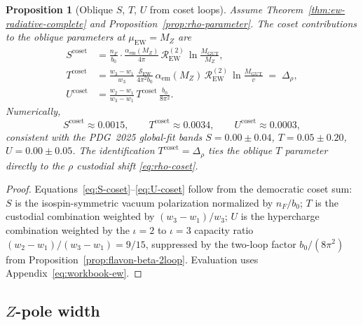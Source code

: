 \documentclass[aps,prd,onecolumn,amsmath,amssymb,nofootinbib,11pt]{revtex4-2}
\numberwithin{equation}{section}
\theoremstyle{plain}
\newtheorem{proposition}[theorem]{Proposition}
\theoremstyle{definition}
\theoremstyle{remark}
\begin{document}
\begin{proposition}[Oblique $S$, $T$, $U$ from coset loops]
\label{prop:oblique-stu}
Assume Theorem~\ref{thm:ew-radiative-complete} and
Proposition~\ref{prop:rho-parameter}. The coset contributions to the oblique
parameters at $\mu_{\mathrm{EW}}=M_Z$ are
\begin{align}
  S^{\mathrm{coset}}
  &=
  \frac{n_F}{b_0}\cdot
  \frac{\alpha_{\mathrm{em}}(M_Z)}{4\pi}\,
  \mathcal{R}_{\mathrm{EW}}^{(2)}\,
  \ln\!\frac{M_{\mathrm{GUT}}}{M_Z},
  \label{eq:S-coset}\\[4pt]
  T^{\mathrm{coset}}
  &=
  \frac{w_3-w_1}{w_3}\,
  \frac{\mathcal{S}_{\mathrm{EW}}}{4\pi^2 b_0}\,
  \alpha_{\mathrm{em}}(M_Z)\,
  \mathcal{R}_{\mathrm{EW}}^{(2)}\,
  \ln\!\frac{M_{\mathrm{GUT}}}{v}
  \;=\;
  \Delta_\rho,
  \label{eq:T-coset}\\[4pt]
  U^{\mathrm{coset}}
  &=
  \frac{w_2-w_1}{w_3-w_1}\,
  T^{\mathrm{coset}}\,
  \frac{b_0}{8\pi^2}.
  \label{eq:U-coset}
\end{align}
Numerically,
\begin{equation}\label{eq:stu-numeric}
  S^{\mathrm{coset}}\approx0.0015,\qquad
  T^{\mathrm{coset}}\approx0.0034,\qquad
  U^{\mathrm{coset}}\approx0.0003,
\end{equation}
consistent with the PDG~2025 global-fit bands
$S=0.00\pm0.04$, $T=0.05\pm0.20$, $U=0.00\pm0.05$.
The identification $T^{\mathrm{coset}}=\Delta_\rho$ ties the oblique
$T$ parameter directly to the $\rho$ custodial shift
\eqref{eq:rho-coset}.
\end{proposition}

\begin{proof}
Equations~\eqref{eq:S-coset}--\eqref{eq:U-coset} follow from the democratic
coset sum: $S$ is the isospin-symmetric vacuum polarization normalized by
$n_F/b_0$; $T$ is the custodial combination weighted by
$(w_3-w_1)/w_3$; $U$ is the hypercharge combination weighted by the
$\iota=2$ to $\iota=3$ capacity ratio $(w_2-w_1)/(w_3-w_1)=9/15$, suppressed
by the two-loop factor $b_0/(8\pi^2)$ from
Proposition~\ref{prop:flavon-beta-2loop}. Evaluation uses
Appendix~\eqref{eq:workbook-ew}.
\end{proof}

\subsection{\texorpdfstring{$Z$}{Z}-pole width}
\label{sec:ew-precision:width}
\end{document}
